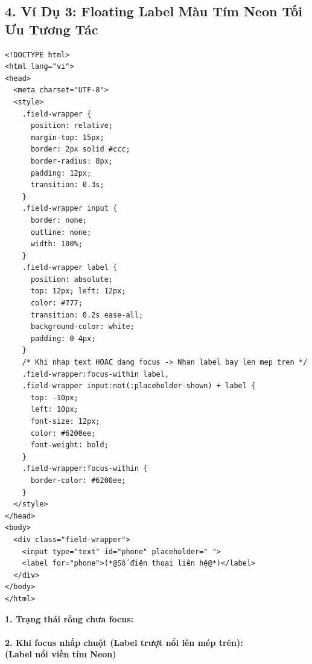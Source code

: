 \subsection{4. Ví Dụ 3: Floating Label Màu Tím Neon Tối Ưu Tương Tác}

\begin{codeWindow}
\begin{lstlisting}[language=HTML5]
<!DOCTYPE html>
<html lang="vi">
<head>
  <meta charset="UTF-8">
  <style>
    .field-wrapper {
      position: relative;
      margin-top: 15px;
      border: 2px solid #ccc;
      border-radius: 8px;
      padding: 12px;
      transition: 0.3s;
    }
    .field-wrapper input {
      border: none;
      outline: none;
      width: 100%;
    }
    .field-wrapper label {
      position: absolute;
      top: 12px; left: 12px;
      color: #777;
      transition: 0.2s ease-all;
      background-color: white;
      padding: 0 4px;
    }
    /* Khi nhap text HOAC dang focus -> Nhan label bay len mep tren */
    .field-wrapper:focus-within label,
    .field-wrapper input:not(:placeholder-shown) + label {
      top: -10px;
      left: 10px;
      font-size: 12px;
      color: #6200ee;
      font-weight: bold;
    }
    .field-wrapper:focus-within {
      border-color: #6200ee;
    }
  </style>
</head>
<body>
  <div class="field-wrapper">
    <input type="text" id="phone" placeholder=" ">
    <label for="phone">(*@Số điện thoại liên hệ@*)</label>
  </div>
</body>
</html>
\end{lstlisting}
\end{codeWindow}

\begin{browserWindow}
\sffamily\small
\textbf{1. Trạng thái rỗng chưa focus:}\\[2pt]
\\[8pt]
\textbf{2. Khi focus nhấp chuột (Label trượt nổi lên mép trên):}\\[2pt]
 \quad \textcolor{purple!80!black}{\bfseries (Label nổi viền tím Neon)}
\end{browserWindow}

